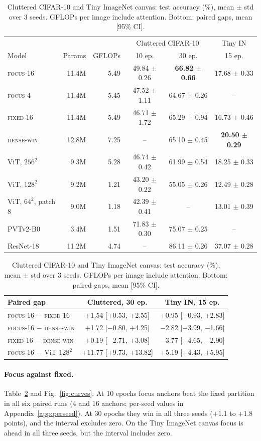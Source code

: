 \documentclass[10pt]{article}
\newcommand{\focus}{\textsc{focus}}
\newcommand{\fixed}{\textsc{fixed}}
\newcommand{\densewin}{\textsc{dense-win}}
\begin{document}
\begin{table}[t]
\centering
\caption{Cluttered CIFAR-10 and Tiny ImageNet canvas: test accuracy (\%), mean $\pm$ std over 3
seeds. GFLOPs per image include attention. Bottom: paired gaps, mean [95\% CI].}
\label{tab:main}
\begin{tabular}{lrrccc}
\toprule
& & & \multicolumn{2}{c}{Cluttered CIFAR-10} & Tiny IN \\
Model & Params & GFLOPs & 10 ep. & 30 ep. & 15 ep. \\
\midrule
\focus-16 & 11.4M & 5.49 & 49.84 $\pm$ 0.26 & \textbf{66.82 $\pm$ 0.66} & 17.68 $\pm$ 0.33 \\
\focus-4 & 11.4M & 5.45 & 47.52 $\pm$ 1.11 & 64.67 $\pm$ 0.26 & -- \\
\fixed-16 & 11.4M & 5.49 & 46.71 $\pm$ 1.72 & 65.29 $\pm$ 0.94 & 16.73 $\pm$ 0.46 \\
\densewin & 12.8M & 7.25 & -- & 65.10 $\pm$ 0.45 & \textbf{20.50 $\pm$ 0.29} \\
ViT, $256^2$ & 9.3M & 5.28 & 46.74 $\pm$ 0.42 & 61.99 $\pm$ 0.54 & 18.25 $\pm$ 0.33 \\
ViT, $128^2$ & 9.2M & 1.21 & 43.20 $\pm$ 0.22 & 55.05 $\pm$ 0.26 & 12.49 $\pm$ 0.28 \\
ViT, $64^2$, patch 8 & 9.0M & 1.18 & 42.39 $\pm$ 0.41 & -- & 13.01 $\pm$ 0.39 \\
\midrule
PVTv2-B0 & 3.4M & 1.51 & 71.83 $\pm$ 0.30 & 75.07 $\pm$ 0.25 & -- \\
ResNet-18 & 11.2M & 4.74 & -- & 86.11 $\pm$ 0.26 & 37.07 $\pm$ 0.28 \\
\bottomrule
\end{tabular}

\vspace{2mm}
\begin{tabular}{lcc}
\toprule
Paired gap & Cluttered, 30 ep. & Tiny IN, 15 ep. \\
\midrule
\focus-16 $-$ \fixed-16 & +1.54 [+0.53, +2.55] & +0.95 [$-$0.93, +2.83] \\
\focus-16 $-$ \densewin & +1.72 [$-$0.80, +4.25] & $-$2.82 [$-$3.99, $-$1.66] \\
\fixed-16 $-$ \densewin & +0.19 [$-$2.71, +3.08] & $-$3.77 [$-$4.65, $-$2.90] \\
\focus-16 $-$ ViT $128^2$ & +11.77 [+9.73, +13.82] & +5.19 [+4.43, +5.95] \\
\bottomrule
\end{tabular}
\end{table}

\paragraph{Focus against fixed.} Table~\ref{tab:main} and Fig.~\ref{fig:curves}. At 10 epochs focus anchors beat the fixed
partition in all six paired runs (4 and 16 anchors; per-seed values in
Appendix~\ref{app:perseed}). At 30 epochs they win in all three seeds (+1.1 to +1.8 points), and
the interval excludes zero. On the Tiny ImageNet canvas focus is ahead in all three seeds, but the
interval includes zero.
\end{document}
